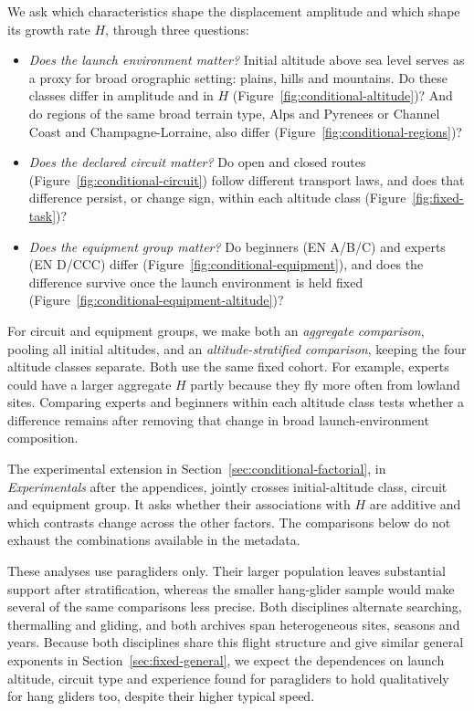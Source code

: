 We ask which characteristics shape the displacement amplitude and which shape
its growth rate $H$, through three questions:
\begin{itemize}
 \item \emph{Does the launch environment matter?} Initial altitude above sea level
 serves as a proxy for broad orographic setting: plains, hills and mountains. Do
 these classes differ in amplitude and in $H$
 (Figure~\ref{fig:conditional-altitude})? And do regions of the same broad terrain
 type, Alps and Pyrenees or Channel Coast and Champagne-Lorraine, also differ
 (Figure~\ref{fig:conditional-regions})?
 \item \emph{Does the declared circuit matter?} Do open and closed routes
 (Figure~\ref{fig:conditional-circuit}) follow different transport laws, and does
 that difference persist, or change sign, within each altitude class
 (Figure~\ref{fig:fixed-task})?
 \item \emph{Does the equipment group matter?} Do beginners (EN A/B/C) and experts
 (EN D/CCC) differ (Figure~\ref{fig:conditional-equipment}), and does the
 difference survive once the launch environment is held fixed
 (Figure~\ref{fig:conditional-equipment-altitude})?
\end{itemize}
For circuit and equipment groups, we make both an \emph{aggregate comparison},
pooling all initial altitudes, and an \emph{altitude-stratified comparison},
keeping the four altitude classes separate. Both use the same fixed cohort.
For example, experts could have a larger aggregate $H$ partly because they fly
more often from lowland sites. Comparing experts and beginners within each
altitude class tests whether a difference remains after removing that change
in broad launch-environment composition.

The experimental extension in Section~\ref{sec:conditional-factorial},
in \emph{Experimentals} after the appendices, jointly crosses initial-altitude
class, circuit and equipment group. It asks
whether their associations with $H$ are additive and which contrasts change
across the other factors. The comparisons below do not exhaust
the combinations available in the metadata.

These analyses use paragliders only. Their larger population leaves substantial
support after stratification, whereas the smaller hang-glider sample would make
several of the same comparisons less precise. Both disciplines alternate searching,
thermalling and gliding, and both archives span heterogeneous sites, seasons and
years. Because both disciplines share this flight structure and give similar general
exponents in Section~\ref{sec:fixed-general}, we expect the dependences on
launch altitude, circuit type and experience found for paragliders to hold
qualitatively for hang gliders too, despite their higher typical speed.

